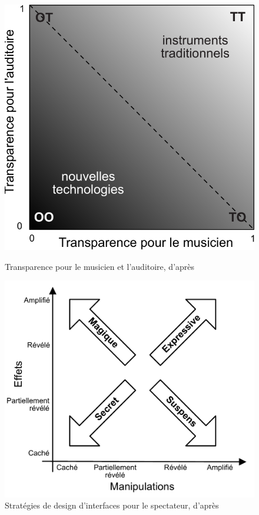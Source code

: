 \begin{figure}[!htbp]
	\captionsetup{format=plain}%
	\centering
	\begin{minipage}[t]{0.48\textwidth}
		\includegraphics[width=0.9\linewidth]{gfx/03_gesture/Fels-transparency.pdf}
		\caption[Transparence pour le musicien et l'auditoire (Fels)]{Transparence pour le musicien et l'auditoire, d'après \cite{fels_mapping_2002}}
		\label{fig:gesture:fels_transparency}
	\end{minipage}
	\hspace{.02\linewidth}
	\begin{minipage}[t]{0.48\textwidth}
		\includegraphics[width=1.1\linewidth]{gfx/03_gesture/ManipulationVsEffect2.pdf}
		\caption[Stratégies de design d'interfaces pour le spectateur (Benford)]{Stratégies de design d'interfaces pour le spectateur, d'après \cite{reeves_designing_2005, benford_performing_2010}}
		\label{fig:gesture:Benford}
	\end{minipage}
\end{figure}
